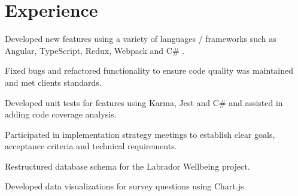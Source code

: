 \documentclass[]{chris_katsaras_resume}
\begin{document}
%



%
%

\hfill
\begin{minipage}[t]{1\textwidth} 


\section{Experience}

\vspace{\topsep}
\begin{tightemize}\item Developed new features using a variety of languages / frameworks such as Angular, TypeScript, Redux, Webpack and C\# .
\item Fixed bugs and refactored functionality to ensure code quality was maintained and met clients standards. 
\item Developed unit tests for features using Karma, Jest and C\# and assisted in adding code coverage analysis. 
\item Participated in implementation strategy meetings to establish clear goals, acceptance criteria and technical requirements.

\end{tightemize}
\sectionsep

\begin{tightemize}
\item Restructured database schema for the Labrador Wellbeing project.\item Developed data visualizations for survey questions using Chart.js.\end{tightemize}
\sectionsep


\end{minipage}
\end{document}
